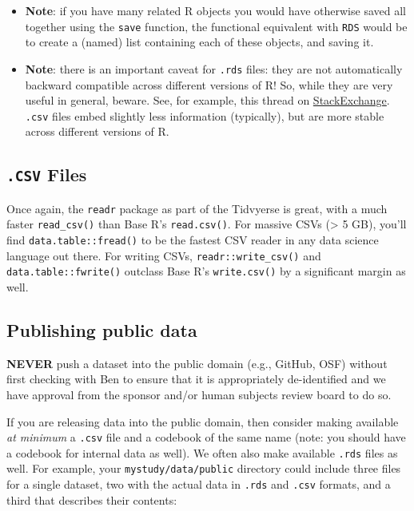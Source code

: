 \documentclass[]{book}
\begin{document}
\begin{itemize}
\item
  \textbf{Note}: if you have many related R objects you would have otherwise saved all together using the \texttt{save} function, the functional equivalent with \texttt{RDS} would be to create a (named) list containing each of these objects, and saving it.
\item
  \textbf{Note}: there is an important caveat for \texttt{.rds} files: they are not automatically backward compatible across different versions of R! So, while they are very useful in general, beware. See, for example, this thread on \href{https://stackoverflow.com/questions/56704638/write-a-file-using-saverds-so-that-it-is-backwards-compatible-with-old-versi}{StackExchange}. \texttt{.csv} files embed slightly less information (typically), but are more stable across different versions of R.
\end{itemize}

\hypertarget{csv-files}{%
\subsection{\texorpdfstring{\texttt{.CSV} Files}{.CSV Files}}\label{csv-files}}

Once again, the \texttt{readr} package as part of the Tidvyerse is great, with a much faster \texttt{read\_csv()} than Base R's \texttt{read.csv()}. For massive CSVs (\textgreater{} 5 GB), you'll find \texttt{data.table::fread()} to be the fastest CSV reader in any data science language out there. For writing CSVs, \texttt{readr::write\_csv()} and \texttt{data.table::fwrite()} outclass Base R's \texttt{write.csv()} by a significant margin as well.

\hypertarget{publishing-public-data}{%
\subsection{Publishing public data}\label{publishing-public-data}}

\textbf{NEVER} push a dataset into the public domain (e.g., GitHub, OSF) without first checking with Ben to ensure that it is appropriately de-identified and we have approval from the sponsor and/or human subjects review board to do so.

If you are releasing data into the public domain, then consider making available \emph{at minimum} a \texttt{.csv} file and a codebook of the same name (note: you should have a codebook for internal data as well). We often also make available \texttt{.rds} files as well. For example, your \texttt{mystudy/data/public} directory could include three files for a single dataset, two with the actual data in \texttt{.rds} and \texttt{.csv} formats, and a third that describes their contents:
\end{document}
